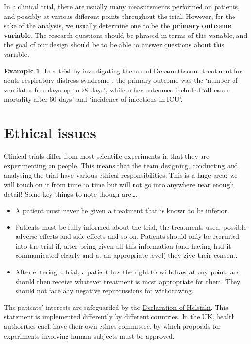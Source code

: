 \documentclass[
  openany]{book}
\providecommand{\tightlist}{%
  \setlength{\itemsep}{0pt}\setlength{\parskip}{0pt}}
\theoremstyle{definition}
\theoremstyle{definition}
\newtheorem{example}{Example}[chapter]
\theoremstyle{definition}
\theoremstyle{definition}
\theoremstyle{remark}
\begin{document}
In a clinical trial, there are usually many measurements performed on patients, and possibly at various different points throughout the trial. However, for the sake of the analysis, we usually determine one to be the \textbf{primary outcome variable}. The research questions should be phrased in terms of this variable, and the goal of our design should be to be able to answer questions about this variable.

\begin{example}
In a trial by \citet{villar2020dexamethasone} investigating the use of Dexamethasone treatment for acute respiratory distress syndrome , the primary outcome was the `number of ventilator free days up to 28 days', while other outcomes included `all-cause mortality after 60 days' and `incidence of infections in ICU'.
\end{example}

\section{Ethical issues}\label{ethical-issues}

Clinical trials differ from most scientific experiments in that they are experimenting on people. This means that the team designing, conducting and analysing the trial have various ethical responsibilities. This is a huge area; we will touch on it from time to time but will not go into anywhere near enough detail! Some key things to note though are\ldots.

\begin{itemize}
\tightlist
\item
  A patient must never be given a treatment that is known to be inferior.
\item
  Patients must be fully informed about the trial, the treatments used, possible adverse effects and side-effects and so on. Patients should only be recruited into the trial if, after being given all this information (and having had it communicated clearly and at an appropriate level) they give their consent.
\item
  After entering a trial, a patient has the right to withdraw at any point, and should then receive whatever treatment is most appropriate for them. They should not face any negative repurcussions for withdrawing.
\end{itemize}

The patients' interests are safeguarded by the \href{https://www.wma.net/policies-post/wma-declaration-of-helsinki-ethical-principles-for-medical-research-involving-human-subjects/}{Declaration of Helsinki}. This statement is implemented differently by different countries. In the UK, health authorities each have their own ethics committee, by which proposals for experiments involving human subjects must be approved.
\end{document}
